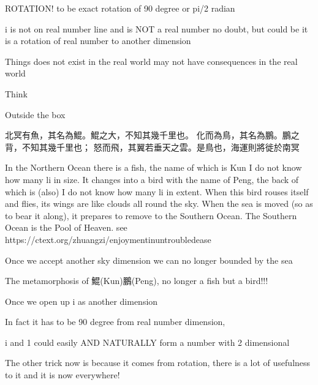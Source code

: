 \documentclass[letterpaper,10pt,english]{jupyterBook}
\begin{document}
\begin{sphinxVerbatim}[commandchars=\\\{\}]
ROTATION! to be exact rotation of 90 degree or pi/2 radian

i is not on real number line and is NOT a real number no doubt, 
but could be it is a rotation of real number to another dimension

Things does not exist in the real world may not have consequences in the real world

Think

Outside the box

北冥有魚，其名為鯤。鯤之大，不知其幾千里也。
化而為鳥，其名為鵬。鵬之背，不知其幾千里也；
怒而飛，其翼若垂天之雲。是鳥也，海運則將徙於南冥

In the Northern Ocean there is a fish, the name of which is Kun 
    \PYGZhy{} I do not know how many li in size. 
It changes into a bird with the name of Peng, 
    the back of which is (also) \PYGZhy{} I do not know how many li in extent. 
When this bird rouses itself and flies, 
    its wings are like clouds all round the sky. 
    When the sea is moved (so as to bear it along), 
    it prepares to remove to the Southern Ocean. 
    The Southern Ocean is the Pool of Heaven.
    see https://ctext.org/zhuangzi/enjoyment\PYGZhy{}in\PYGZhy{}untroubled\PYGZhy{}ease
    
   
Once we accept another sky dimension we can no longer bounded by the sea
   
    The metamorphosis of 鯤(Kun)鵬(Peng), no longer a fish but a bird!!!
\end{sphinxVerbatim}

\begin{sphinxVerbatim}[commandchars=\\\{\}]
Once we open up i as another dimension 

In fact it has to be 90 degree from real number dimension, 

i and 1 could easily AND NATURALLY form a number with 2 dimensional

The other trick now is because it comes from rotation, 
    there is a lot of usefulness to it and it is now everywhere!
\end{sphinxVerbatim}
\end{document}
